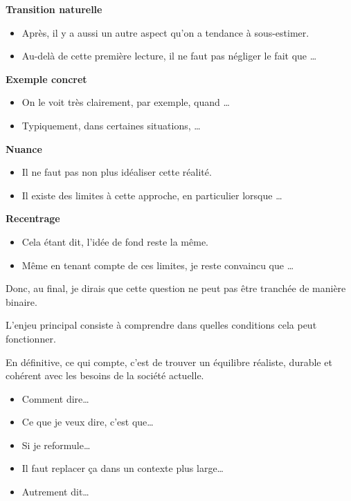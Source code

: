 \documentclass[12pt,a4paper]{article}
\begin{document}
\begin{tcolorbox}[title=\textbf{ÉTAPE 3 · Second angle, exemple et nuance ($\approx$ 1 min 30)}]
\textbf{Transition naturelle}
\begin{itemize}
  \item Après, il y a aussi un autre aspect qu'on a tendance à sous-estimer.
  \item Au-delà de cette première lecture, il ne faut pas négliger le fait que …
\end{itemize}

\textbf{Exemple concret}
\begin{itemize}
  \item On le voit très clairement, par exemple, quand …
  \item Typiquement, dans certaines situations, …
\end{itemize}

\textbf{Nuance}
\begin{itemize}
  \item Il ne faut pas non plus idéaliser cette réalité.
  \item Il existe des limites à cette approche, en particulier lorsque …
\end{itemize}

\textbf{Recentrage}
\begin{itemize}
  \item Cela étant dit, l'idée de fond reste la même.
  \item Même en tenant compte de ces limites, je reste convaincu que …
\end{itemize}
\end{tcolorbox}

\begin{tcolorbox}[title=\textbf{ÉTAPE 4 · Conclusion contrôlée ($\approx$ 50 s)}]
Donc, au final, je dirais que cette question ne peut pas être tranchée de manière binaire.

L'enjeu principal consiste à comprendre dans quelles conditions cela peut fonctionner.

En définitive, ce qui compte, c'est de trouver un équilibre réaliste, durable et cohérent avec les besoins de la société actuelle.
\end{tcolorbox}

\begin{tcolorbox}[title=\textbf{Remplissages d'urgence (fluidité orale)}]
\begin{itemize}
  \item Comment dire…
  \item Ce que je veux dire, c'est que…
  \item Si je reformule…
  \item Il faut replacer ça dans un contexte plus large…
  \item Autrement dit…
\end{itemize}
\end{tcolorbox}
\end{document}
